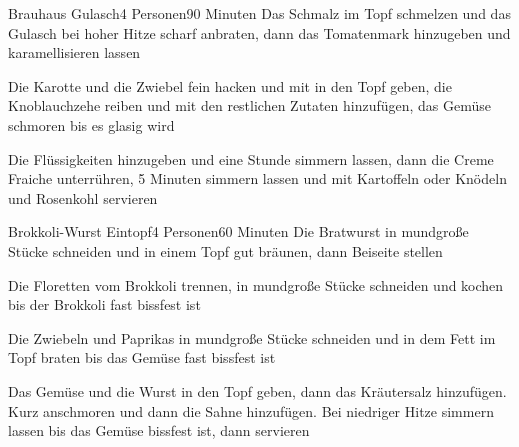 \begin{recipe}{Brauhaus Gulasch}{4 Personen}{90 Minuten}
Das Schmalz im Topf schmelzen und das Gulasch bei hoher Hitze scharf anbraten, dann das Tomatenmark hinzugeben und karamellisieren lassen

Die Karotte und die Zwiebel fein hacken und mit in den Topf geben, die Knoblauchzehe reiben und mit den restlichen Zutaten hinzufügen, das Gemüse schmoren bis es glasig wird

Die Flüssigkeiten hinzugeben und eine Stunde simmern lassen, dann die Creme Fraiche unterrühren, 5 Minuten simmern lassen und mit Kartoffeln oder Knödeln und Rosenkohl servieren

\end{recipe} 


\begin{recipe}{Brokkoli-Wurst Eintopf}{4 Personen}{60 Minuten}
Die Bratwurst in mundgroße Stücke schneiden und in einem Topf gut bräunen, dann Beiseite stellen

Die Floretten vom Brokkoli trennen, in mundgroße Stücke schneiden und kochen bis der Brokkoli fast bissfest ist

Die Zwiebeln und Paprikas in mundgroße Stücke schneiden und in dem Fett im Topf braten bis das Gemüse fast bissfest ist

Das Gemüse und die Wurst in den Topf geben, dann das Kräutersalz hinzufügen. Kurz anschmoren und dann die Sahne hinzufügen. Bei niedriger Hitze simmern lassen bis das Gemüse bissfest ist, dann servieren

\end{recipe} 


